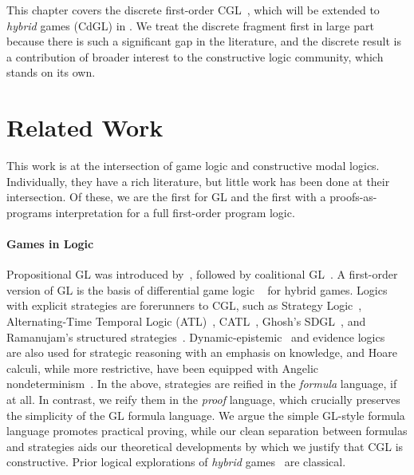 \documentclass[12pt]{cmuthesis}
\theoremstyle{definition}
\theoremstyle{remark}
\newcommand{\rref}[2][]{\prettyref{#2}}
\newcommand{\CGL}{\textsf{CGL}\xspace}
\newcommand{\CdGL}{\textsf{CdGL}\xspace}
\newcommand{\GL}{GL\xspace}
\begin{document}
This chapter covers the discrete first-order \CGL~\cite{poplcgl}, which will be extended to \emph{hybrid} games (\CdGL) in \rref{ch:cdgl}.
We treat the discrete fragment first in large part because there is such a significant gap in the literature, and the discrete result is a contribution of broader interest to the constructive logic community, which stands on its own.

\section{Related Work}
\label{sec:cgl-relwork}
This work is at the intersection of game logic and constructive modal logics.
Individually, they have a rich literature, but little work has been done at their intersection.
Of these, we are the first for \GL and the first with a proofs-as-programs interpretation for a full first-order program logic.

\paragraph{Games in Logic} 
Propositional \GL was introduced by~\cite{DBLP:conf/focs/Parikh83}, followed by coalitional \GL~\cite{DBLP:journals/logcom/Pauly02}.
A first-order version of \GL is the basis of differential game logic \dGL~\cite{DBLP:journals/tocl/Platzer15} for hybrid games.
Logics with explicit strategies are forerunners to \CGL, such as Strategy Logic~\cite{DBLP:conf/concur/ChatterjeeHP07}, Alternating-Time Temporal Logic (ATL)~\cite{DBLP:journals/jacm/AlurHK02}, CATL~\cite{DBLP:conf/atal/HoekJW05}, Ghosh's SDGL~\cite{ghosh2008strategies}, and Ramanujam's structured strategies~\cite{DBLP:conf/kr/RamanujamS08}.
Dynamic-epistemic~\cite{DBLP:series/lncs/Benthem15,DBLP:journals/games/BenthemPR11,van2001games} and evidence logics~\cite{DBLP:journals/sLogica/BenthemP11} are also used for strategic reasoning with an emphasis on knowledge, and Hoare calculi, while more restrictive, have been equipped with Angelic nondeterminism~\cite{DBLP:journals/corr/Mamouras16}.
In the above, strategies are reified in the \emph{formula} language, if at all.
In contrast, we reify them in the \emph{proof} language, which crucially preserves the simplicity of the \GL formula language.
We argue the simple \GL-style formula language promotes practical proving, while our clean separation between formulas and strategies aids our theoretical developments by which we justify that \CGL is constructive.
Prior logical explorations of \emph{hybrid} games~\cite{DBLP:conf/cade/QueselP12,DBLP:journals/tocl/Platzer15,DBLP:journals/tocl/Platzer17,DBLP:conf/cade/Platzer18} are classical.
\end{document}
